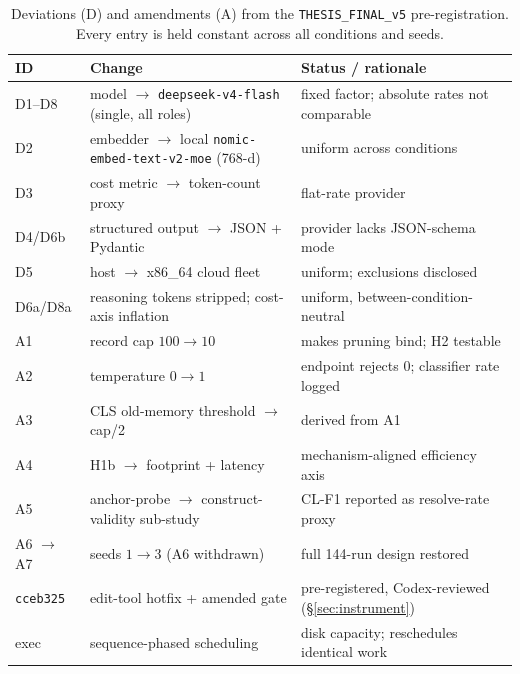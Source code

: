 \begin{table}[htbp]
  \centering
  \caption{Deviations (D) and amendments (A) from the \texttt{THESIS\_FINAL\_v5}
  pre-registration. Every entry is held constant across all conditions and seeds.}
  \label{tab:deviations}
  \begin{tabularx}{\textwidth}{@{}l >{\raggedright\arraybackslash}X >{\raggedright\arraybackslash}X@{}}
    \toprule
    ID & Change & Status / rationale \\
    \midrule
    D1--D8 & model $\to$ \texttt{deepseek-v4-flash} (single, all roles) & fixed factor; absolute rates not comparable \\
    D2 & embedder $\to$ local \texttt{nomic-embed-text-v2-moe} (768-d) & uniform across conditions \\
    D3 & cost metric $\to$ token-count proxy & flat-rate provider \\
    D4/D6b & structured output $\to$ JSON + Pydantic & provider lacks JSON-schema mode \\
    D5 & host $\to$ x86\_64 cloud fleet & uniform; exclusions disclosed \\
    D6a/D8a & reasoning tokens stripped; cost-axis inflation & uniform, between-condition-neutral \\
    A1 & record cap $100 \to 10$ & makes pruning bind; H2 testable \\
    A2 & temperature $0 \to 1$ & endpoint rejects 0; classifier rate logged \\
    A3 & CLS old-memory threshold $\to$ cap/2 & derived from A1 \\
    A4 & H1b $\to$ footprint + latency & mechanism-aligned efficiency axis \\
    A5 & anchor-probe $\to$ construct-validity sub-study & CL-F1 reported as resolve-rate proxy \\
    A6 $\to$ A7 & seeds $1 \to 3$ (A6 withdrawn) & full 144-run design restored \\
    \texttt{cceb325} & edit-tool hotfix + amended gate & pre-registered, Codex-reviewed (\S\ref{sec:instrument}) \\
    exec & sequence-phased scheduling & disk capacity; reschedules identical work \\
    \bottomrule
  \end{tabularx}
\end{table}
